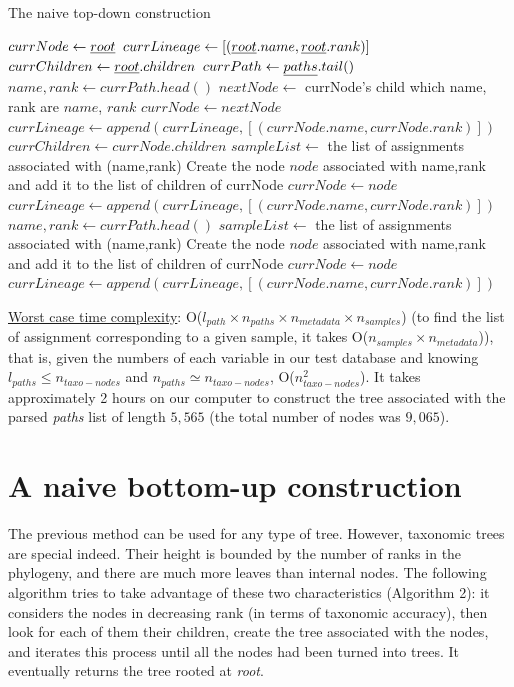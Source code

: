 \documentclass{report}
\begin{document}
\begin{algorithm}
\caption{The naive top-down construction}
\begin{algorithmic}
\STATE $currNode \leftarrow \emph{root}$
\STATE $currLineage \leftarrow [ (\emph{root}.name, \emph{root}.rank) ]$
\STATE $currChildren \leftarrow \emph{root}.children$
\STATE $currPath \leftarrow \emph{paths}.tail()$
\STATE $name,rank \leftarrow currPath.head()$
\STATE $nextNode \leftarrow$ currNode's child which name, rank are $name$, $rank$
\STATE $currNode \leftarrow nextNode$ 
\STATE $currLineage \leftarrow append(currLineage,[(currNode.name,currNode.rank)])$
\STATE $currChildren \leftarrow currNode.children$
\ELSE
\STATE $sampleList \leftarrow$ the list of assignments associated with (name,rank)
\STATE Create the node $node$ associated with name,rank and add it to the list of children of currNode
\STATE $currNode \leftarrow node$
\STATE $currLineage \leftarrow append(currLineage,[(currNode.name,currNode.rank)]) $
\STATE $name,rank \leftarrow currPath.head()$
\STATE $sampleList \leftarrow$ the list of assignments associated with (name,rank)
\STATE Create the node $node$ associated with name,rank and add it to the list of children of currNode
\STATE $currNode \leftarrow node$
\STATE $currLineage \leftarrow append(currLineage,[(currNode.name,currNode.rank)]) $
\ENDWHILE
\ENDIF
\ENDWHILE
\ENDFOR
{}
\end{algorithmic}
\end{algorithm}

\uline{Worst case time complexity}: O($l_{path} \times n_{paths} \times n_{metadata} \times n_{samples}$) (to find the list of assignment corresponding to a given sample, it takes O($n_{samples} \times n_{metadata}$)), that is, given the numbers of each variable in our test database and knowing $l_{paths} \le n_{taxo-nodes}$ and $n_{paths} \simeq n_{taxo-nodes}$, O($n_{taxo-nodes}^{2}$). It takes approximately 2 hours on our computer to construct the tree associated with the parsed \emph{paths} list of length $5,565$ (the total number of nodes was $9,065$).

\section{A naive bottom-up construction}

The previous method can be used for any type of tree. However, taxonomic trees are special indeed. Their height is bounded by the number of ranks in the phylogeny, and there are much more leaves than internal nodes. The following algorithm tries to take advantage of these two characteristics (Algorithm 2): it considers the nodes in decreasing rank (in terms of taxonomic accuracy), then look for each of them their children, create the tree associated with the nodes, and iterates this process until all the nodes had been turned into trees. It eventually returns the tree rooted at \emph{root}.\\
\end{document}
